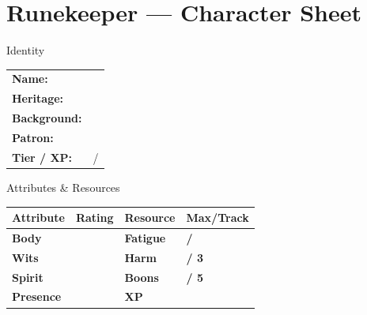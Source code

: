 \documentclass[10pt]{article}
\begin{document}
\newpage

\section*{Runekeeper --- Character Sheet}

\begin{minipage}[t]{0.48\linewidth}
    \begin{charbox}{Identity}
        \begin{tabular}{p{2.5cm} p{5cm}}
            \textbf{Name:} & \underline{\hspace{4cm}} \\
            \textbf{Heritage:} & \underline{\hspace{4cm}} \\
            \textbf{Background:} & \underline{\hspace{4cm}} \\
            \textbf{Patron:} & \underline{\hspace{4cm}} \\
            \textbf{Tier / XP:} & \underline{\hspace{2cm}} / \underline{\hspace{2cm}} \\
        \end{tabular}
    \end{charbox}
    
    \vspace{0.5em}
    
    \begin{charbox}{Attributes \& Resources}
        \begin{tabular}{>{\bfseries}p{2.5cm} >{\bfseries}p{1.5cm} >{\bfseries}p{2.5cm} >{\bfseries}p{1.5cm}}
            \toprule
            \textbf{Attribute} & \textbf{Rating} & \textbf{Resource} & \textbf{Max/Track} \\
            \midrule
            Body & \underline{\hspace{1.5cm}} & Fatigue & \underline{\hspace{1.5cm}} / \underline{\hspace{1.5cm}} \\
            Wits & \underline{\hspace{1.5cm}} & Harm & \underline{\hspace{1.5cm}} / 3 \\
            Spirit & \underline{\hspace{1.5cm}} & Boons & \underline{\hspace{1.5cm}} / 5 \\
            Presence & \underline{\hspace{1.5cm}} & XP & \underline{\hspace{1.5cm}} \\
            \bottomrule
        \end{tabular}
    \end{charbox}
    

\end{minipage}
\end{document}

